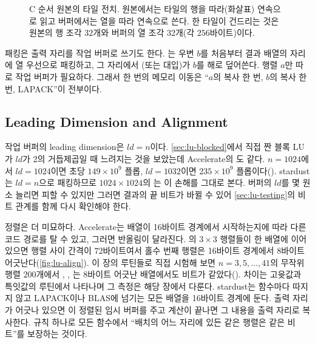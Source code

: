 \begin{figure}[t]
\centering
{}
\caption{C 순서 원본의 타일 전치. 원본에서는 타일의 행을 따라(화살표) 연속으로 읽고 버퍼에서는 열을 따라 연속으로 쓴다. 한 타일이 건드리는 것은 원본의 행 조각 $32$개와 버퍼의 열 조각 $32$개(각 $256$바이트)이다.}
\label{fig:lu-tile}
\end{figure}

패킹은 출력 자리를 작업 버퍼로 쓰기도 한다. 는 우변 $b$를 처음부터 결과 배열의 자리에 열 우선으로 패킹하고, 그 자리에서 (또는 대입)가 $b$를 해로 덮어쓴다. 행렬 $a$만 따로 작업 버퍼가 필요하다. 그래서  한 번의 메모리 이동은 ``$a$의 복사 한 번, $b$의 복사 한 번, LAPACK''이 전부이다.

\subsection{Leading Dimension and Alignment}

작업 버퍼의 leading dimension은 $\mathit{ld}=n$이다. \cref{sec:lu-blocked}에서 직접 짠 블록 LU가 $\mathit{ld}$가 2의 거듭제곱일 때 느려지는 것을 보았는데 Accelerate의 도 같다. $n=1024$에서 $\mathit{ld}=1024$이면 초당 $149\times10^9$ 플롭, $\mathit{ld}=1032$이면 $235\times10^9$ 플롭이다(). stardust는 $\mathit{ld}=n$으로 패킹하므로 $1024\times1024$의 는 이 손해를 그대로 본다. 버퍼의 $\mathit{ld}$를 몇 원소 늘리면 피할 수 있지만 그러면 결과의 끝 비트가 바뀔 수 있어 \cref{sec:lu-testing}의 비트 관계를 함께 다시 확인해야 한다.

정렬은 더 미묘하다. Accelerate는 배열이 16바이트 경계에서 시작하는지에 따라 다른 코드 경로를 탈 수 있고, 그러면 반올림이 달라진다. 의 $3\times3$ 행렬들이 한 배열에 이어 있으면 행렬 사이 간격이 $72$바이트여서 홀수 번째 행렬은 16바이트 경계에서 8바이트 어긋난다(\cref{fig:lu-align}). 이 장의 루틴들로 직접 시험해 보면 $n=3,5,\dots,41$의 무작위 행렬 $200$개에서 , , 는 8바이트 어긋난 배열에서도 비트가 같았다(). 차이는 고윳값과 특잇값의 루틴에서 나타나며 그 측정은 해당 장에서 다룬다. stardust는 함수마다 따지지 않고 LAPACK이나 BLAS에 넘기는 모든 배열을 16바이트 경계에 둔다. 출력 자리가 어긋나 있으면 이 정렬된 임시 버퍼를 주고 계산이 끝나면 그 내용을 출력 자리로 복사한다. 규칙 하나로 모든 함수에서 ``배치의 어느 자리에 있든 같은 행렬은 같은 비트''를 보장하는 것이다.

